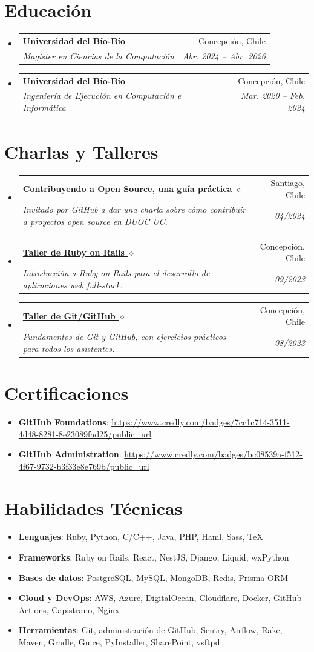 \documentclass[letterpaper,11pt]{article}
\makeatletter
\newcommand{\resumeSubheading}[4]{
	\vspace{-1pt}\item
	\begin{tabular*}{0.97\textwidth}[t]{l@{\extracolsep{\fill}}r}
		\textbf{#1} & #2 \\
		\textit{\small#3} & \textit{\small #4} \\
	\end{tabular*}\vspace{-5pt}
}
\newcommand{\resumeSubHeadingListStart}{\begin{itemize}[leftmargin=*]}
\newcommand{\resumeSubHeadingListEnd}{\end{itemize}}
\makeatother
\begin{document}
	\section{Educación}
	\resumeSubHeadingListStart
	\resumeSubheading
	{Universidad del Bío-Bío}{Concepción, Chile}
	{Magíster en Ciencias de la Computación}{Abr. 2024 -- Abr. 2026}
	\resumeSubheading
	{Universidad del Bío-Bío}{Concepción, Chile}
	{Ingeniería de Ejecución en Computación e Informática}{Mar. 2020 -- Feb. 2024}
	\resumeSubHeadingListEnd
	
	\section{Charlas y Talleres}
	\resumeSubHeadingListStart
	\resumeSubheading
	{\href{https://youtu.be/S_qkjY7k_L8?t=2698}{Contribuyendo a Open Source, una guía práctica $\diamond$}}{Santiago, Chile}
	{Invitado por GitHub a dar una charla sobre cómo contribuir a proyectos open source en DUOC UC.}{04/2024}
	\resumeSubheading
	{\href{https://bgm.cl/about}{Taller de Ruby on Rails $\diamond$}}{Concepción, Chile}
	{Introducción a Ruby on Rails para el desarrollo de aplicaciones web full-stack.}{09/2023}
	\resumeSubheading
	{\href{https://bgm.cl/about}{Taller de Git/GitHub $\diamond$}}{Concepción, Chile}
	{Fundamentos de Git y GitHub, con ejercicios prácticos para todos los asistentes.}{08/2023}
	\resumeSubHeadingListEnd
	
	\section{Certificaciones}
	\resumeSubHeadingListStart
	\item{
		\textbf{GitHub Foundations}{: \url{https://www.credly.com/badges/7cc1c714-3511-4d48-8281-8e23089fad25/public_url}}
	}
	\item{
		\textbf{GitHub Administration}{: \url{https://www.credly.com/badges/bc08539a-f512-4f67-9732-b3f33e8e769b/public_url}}
	}
	\resumeSubHeadingListEnd
	
	\section{Habilidades Técnicas}
	\resumeSubHeadingListStart
	\item{
		\textbf{Lenguajes}{: Ruby, Python, C/C++, Java, PHP, Haml, Sass, TeX}
	}
	\item{
		\textbf{Frameworks}{: Ruby on Rails, React, NestJS, Django, Liquid, wxPython}
	}
	\item{
		\textbf{Bases de datos}{: PostgreSQL, MySQL, MongoDB, Redis, Prisma ORM}
	}
	\item{
		\textbf{Cloud y DevOps}{: AWS, Azure, DigitalOcean, Cloudflare, Docker, GitHub Actions, Capistrano, Nginx}
	}
	\item{
		\textbf{Herramientas}{: Git, administración de GitHub, Sentry, Airflow, Rake, Maven, Gradle, Guice, PyInstaller, SharePoint, vsftpd}
	}
	\resumeSubHeadingListEnd
	
\end{document}
